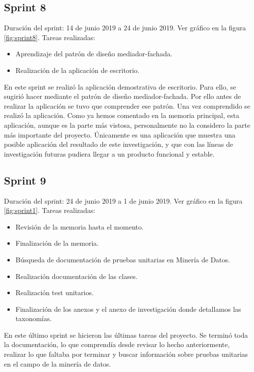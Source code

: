 \subsection{Sprint 8}
Duración del sprint: 14 de junio 2019 a 24 de junio 2019. Ver gráfico  en la figura \ref{fig:sprint8}.
Tareas realizadas:
\begin{itemize}
\item Aprendizaje del patrón de diseño mediador-fachada.
\item Realización de la aplicación de escritorio.
\end{itemize}
En este sprint se realizó la aplicación demostrativa de escritorio. Para ello, se sugirió hacer mediante el patrón de diseño mediador-fachada. Por ello antes de realizar la aplicación se tuvo que comprender ese patrón. Una vez comprendido se realizó la aplicación. Como ya hemos comentado en la memoria principal, esta aplicación, aunque es la parte más vistosa, personalmente no la considero la parte más importante del proyecto. Únicamente es una aplicación que muestra una posible aplicación del resultado de este investigación, y que con las líneas de investigación futuras pudiera llegar a un producto funcional y estable.

\subsection{Sprint 9}
Duración del sprint: 24 de junio 2019 a 1 de junio 2019. Ver gráfico  en la figura \ref{fig:sprint1}.
Tareas realizadas:
\begin{itemize}
\item Revisión de la memoria hasta el momento.
\item Finalización de la memoria.
\item Búsqueda de documentación de pruebas unitarias en Minería de Datos.
\item Realización documentación de las clases.
\item Realización test unitarios.
\item Finalización de los anexos y el anexo de investigación donde detallamos las taxonomías.
\end{itemize}
En este último sprint se hicieron las últimas tareas del proyecto. Se terminó toda la documentación, lo que comprendía desde revisar lo hecho anteriormente, realizar lo que faltaba por terminar y buscar información sobre pruebas unitarias en el campo de la minería de datos.


